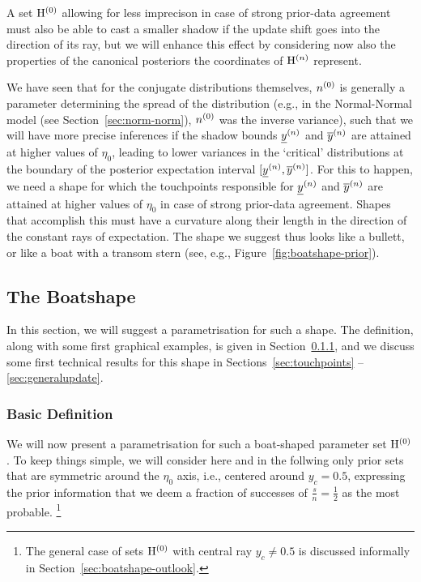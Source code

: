 A set $\mathrm{H}^{(0)}$ allowing for less imprecison in case of strong prior-data agreement
must also be able to cast a smaller shadow if the update shift goes into the direction of its ray,
but we will enhance this effect by considering now also the properties
of the canonical posteriors the coordinates of $\mathrm{H}^{(n)}$ represent.

We have seen that for the conjugate distributions themselves,
$n^{(0)}$ is generally a parameter determining the spread of the distribution
(e.g., in the Normal-Normal model (see Section~\ref{sec:norm-norm}), $n^{(0)}$ was the inverse variance),
such that we will have more precise inferences if the shadow bounds $\underline{y}^{(n)}$ and $\overline{y}^{(n)}$
are attained at higher values of $\eta_0$, leading to lower variances in the
`critical' distributions at the boundary of the posterior expectation interval $[\underline{y}^{(n)},\overline{y}^{(n)}]$.
For this to happen, we need a shape for which the touchpoints responsible for $\underline{y}^{(n)}$ and $\overline{y}^{(n)}$
are attained at higher values of $\eta_0$ in case of strong prior-data agreement.
Shapes that accomplish this must have a curvature along their length in the direction
of the constant rays of expectation.
The shape we suggest thus looks like a bullett, or like a boat with a transom stern
(see, e.g., Figure~\ref{fig:boatshape-prior}).

\subsection{The Boatshape}
\label{sec:boatshape-2}

In this section, %
we will suggest a parametrisation for such a shape.
The definition, along with some first graphical examples, is given in Section~\ref{sec:basicdefboat},
and we discuss some first technical results for this shape in Sections~\ref{sec:touchpoints} -- \ref{sec:generalupdate}.

\subsubsection{Basic Definition}
\label{sec:basicdefboat}

We will now present a parametrisation for such a boat-shaped parameter set $\mathrm{H}^{(0)}$.
To keep things simple, we will consider here and in the follwing only prior sets
that are symmetric around the $\eta_0$ axis, i.e., centered around $y_c = 0.5$,
expressing the prior information that we deem a fraction of successes of $\frac{s}{n} = \frac{1}{2}$
as the most probable.%
\footnote{The general case of sets $\mathrm{H}^{(0)}$ with central ray $y_c \neq 0.5$
is discussed informally in Section~\ref{sec:boatshape-outlook}.}

